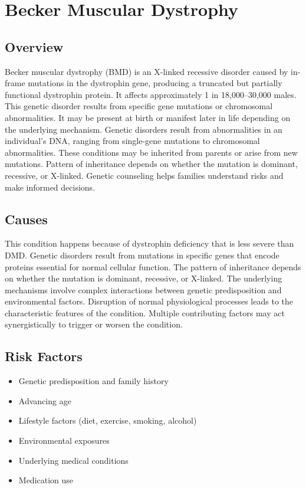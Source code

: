 \chapter{Becker Muscular Dystrophy}
\label{sec:Becker Muscular Dystrophy}

\section{Overview}
Becker muscular dystrophy (BMD) is an X-linked recessive disorder caused by in-frame mutations in the dystrophin gene, producing a truncated but partially functional dystrophin protein. It affects approximately 1 in 18,000--30,000 males. This genetic disorder results from specific gene mutations or chromosomal abnormalities. It may be present at birth or manifest later in life depending on the underlying mechanism. Genetic disorders result from abnormalities in an individual's DNA, ranging from single-gene mutations to chromosomal abnormalities. These conditions may be inherited from parents or arise from new mutations. Pattern of inheritance depends on whether the mutation is dominant, recessive, or X-linked. Genetic counseling helps families understand risks and make informed decisions.
\section{Causes}
This condition happens because of dystrophin deficiency that is less severe than DMD. Genetic disorders result from mutations in specific genes that encode proteins essential for normal cellular function. The pattern of inheritance depends on whether the mutation is dominant, recessive, or X-linked. The underlying mechanisms involve complex interactions between genetic predisposition and environmental factors. Disruption of normal physiological processes leads to the characteristic features of the condition. Multiple contributing factors may act synergistically to trigger or worsen the condition.
\section{Risk Factors}


\begin{itemize}[noitemsep]
  \item Genetic predisposition and family history
  \item Advancing age
  \item Lifestyle factors (diet, exercise, smoking, alcohol)
  \item Environmental exposures
  \item Underlying medical conditions
  \item Medication use
\end{itemize}
